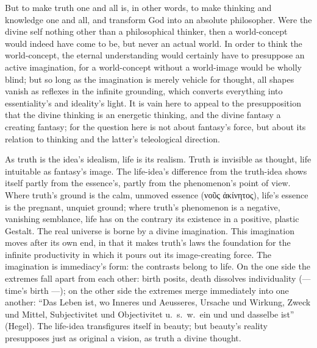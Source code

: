 \documentclass[12pt]{book}
\begin{document}
But to make truth one and all is, in other words, to make thinking and
knowledge one and all, and transform God into an absolute philosopher. Were
the divine self nothing other than a philosophical thinker, then a
world-concept would indeed have come to be, but never an actual world. In
order to think the world-concept, the eternal understanding would certainly
have to presuppose an active imagination, for a world-concept without a
world-image would be wholly blind; but so long as the imagination is merely
vehicle for thought, all shapes vanish as reflexes in the infinite
grounding, which converts everything into essentiality's and ideality's
light. It is vain here to appeal to the presupposition that the divine
thinking is an energetic thinking, and the divine fantasy a creating
fantasy; for the question here is not about fantasy's force, but about its
relation to thinking and the latter's teleological direction.

As truth is the idea's idealism, life is its realism. Truth is invisible as
thought, life intuitable as fantasy's image. The life-idea's difference from
the truth-idea shows itself partly from the essence's, partly from the
phenomenon's point of view. Where truth's ground is the calm, unmoved
essence (νοῦς ἀκίνητος), life's essence is the pregnant, unquiet ground;
where truth's phenomenon is a negative, vanishing semblance, life has on the
contrary its existence in a positive, plastic Gestalt. The real universe is
borne by a divine imagination. This imagination moves after its own end, in
that it makes truth's laws the foundation for the infinite productivity in
which it pours out its image-creating force. The imagination is immediacy's
form: the contrasts belong to life. On the one side the extremes fall apart
from each other: birth posits, death dissolves individuality (--- time's
birth ---); on the other side the extremes merge immediately into one
another: ``Das Leben ist, wo Inneres und Aeusseres, Ursache und Wirkung,
Zweck und Mittel, Subjectivitet und Objectivitet u.\ s.\ w.\ ein und und
dasselbe ist'' (Hegel). The life-idea transfigures itself in beauty; but
beauty's reality presupposes just as original a vision, as truth a divine
thought.
\end{document}
